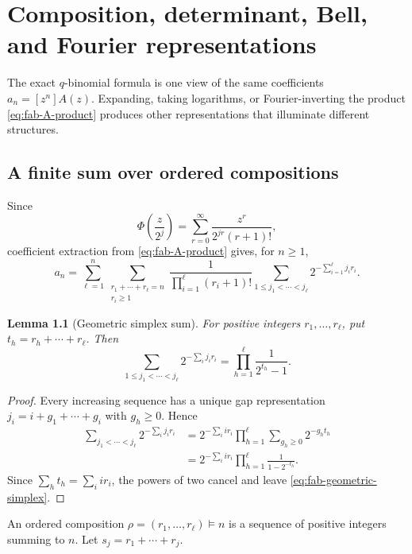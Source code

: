 \documentclass[11pt,oneside,openany]{book}
\newtheorem{lemma}[theorem]{Lemma}
\theoremstyle{definition}
\theoremstyle{remark}
\begin{document}
\chapter{Composition, determinant, Bell, and Fourier representations}\label{chap:fabius-alternatives}

The exact $q$-binomial formula is one view of the same coefficients $a_n=[z^n]A(z)$.  Expanding, taking logarithms, or Fourier-inverting the product \eqref{eq:fab-A-product} produces other representations that illuminate different structures.

\section{A finite sum over ordered compositions}

Since
\[
 \Phi\!\left(\frac z{2^j}\right)
 =\sum_{r=0}^{\infty}\frac{z^r}{2^{jr}(r+1)!},
\]
coefficient extraction from \eqref{eq:fab-A-product} gives, for $n\ge1$,
\begin{equation}
 a_n=\sum_{\ell=1}^n
 \sum_{\substack{r_1+\cdots+r_\ell=n\\r_i\ge1}}
 \frac1{\prod_{i=1}^\ell(r_i+1)!}
 \sum_{1\le j_1<\cdots<j_\ell}
 2^{-\sum_{i=1}^\ell j_ir_i}.
 \label{eq:fab-scale-selection}
\end{equation}

\begin{lemma}[Geometric simplex sum]\label{lem:fab-geometric-simplex}
For positive integers $r_1,\ldots,r_\ell$, put
\(
 t_h=r_h+\cdots+r_\ell
\).  Then
\begin{equation}
 \sum_{1\le j_1<\cdots<j_\ell}
 2^{-\sum_i j_ir_i}
 =\prod_{h=1}^\ell\frac1{2^{t_h}-1}.
 \label{eq:fab-geometric-simplex}
\end{equation}
\end{lemma}

\begin{proof}
Every increasing sequence has a unique gap representation
\(
 j_i=i+g_1+\cdots+g_i
\)
with $g_h\ge0$.  Hence
\begin{align*}
 \sum_{j_1<\cdots<j_\ell}2^{-\sum_i j_ir_i}
 &=2^{-\sum_iir_i}
   \prod_{h=1}^\ell\sum_{g_h\ge0}2^{-g_ht_h}\\
 &=2^{-\sum_iir_i}
   \prod_{h=1}^\ell\frac1{1-2^{-t_h}}.
\end{align*}
Since $\sum_ht_h=\sum_iir_i$, the powers of two cancel and leave \eqref{eq:fab-geometric-simplex}.
\end{proof}

An ordered composition $\rho=(r_1,\ldots,r_\ell)\vDash n$ is a sequence of positive integers summing to $n$.  Let $s_j=r_1+\cdots+r_j$.
\end{document}
